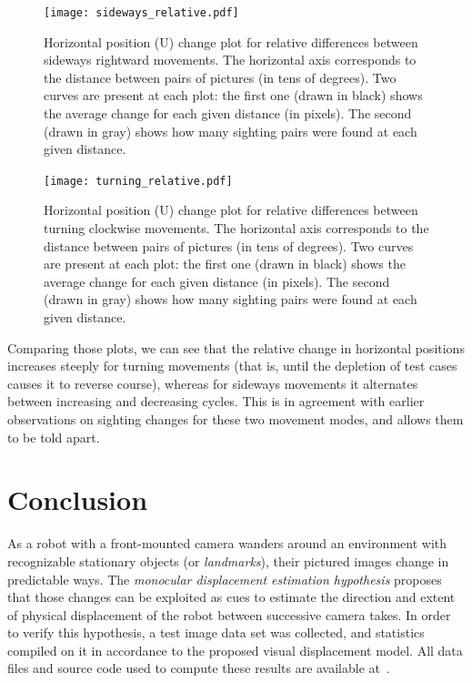\documentclass[twocolumn, 9pt]{jsproceedings}
\begin{document}
\begin{figure}[h!]
\texttt{[image: sideways\_relative.pdf]}
\caption{Horizontal position (U) change plot for relative differences between sideways rightward movements. The horizontal axis corresponds to the distance between pairs of pictures (in tens of degrees). Two curves are present at each plot: the first one (drawn in black) shows the average change for each given distance (in pixels). The second (drawn in gray) shows how many sighting pairs were found at each given distance.}
\label{fig:sideways_relative}
\end{figure}

\begin{figure}[h!]
\texttt{[image: turning\_relative.pdf]}
\caption{Horizontal position (U) change plot for relative differences between turning clockwise movements. The horizontal axis corresponds to the distance between pairs of pictures (in tens of degrees). Two curves are present at each plot: the first one (drawn in black) shows the average change for each given distance (in pixels). The second (drawn in gray) shows how many sighting pairs were found at each given distance.}
\label{fig:turning_relative}
\end{figure}

Comparing those plots, we can see that the relative change in horizontal positions increases steeply for turning movements (that is, until the depletion of test cases causes it to reverse course), whereas for sideways movements it alternates between increasing and decreasing cycles. This is in agreement with earlier observations on sighting changes for these two movement modes, and allows them to be told apart.

\section{Conclusion}

As a robot with a front-mounted camera wanders around an environment with recognizable stationary objects (or {\it landmarks}), their pictured images change in predictable ways. The {\it monocular displacement estimation hypothesis} proposes that those changes can be exploited as cues to estimate the direction and extent of physical displacement of the robot between successive camera takes. In order to verify this hypothesis, a test image data set was collected, and statistics compiled on it in accordance to the proposed visual displacement model. All data files and source code used to compute these results are available at~\cite{helio14a}.
\end{document}
